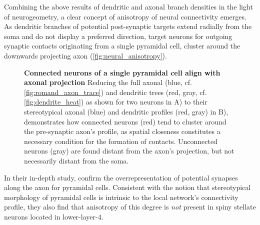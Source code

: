 Combining the above results of dendritic and axonal branch densities
in the light of neurogeometry, a clear concept of anisotropy of neural
connectivity emerges. As dendritic branches of potential post-synaptic
targets extend radially from the soma and do not display a preferred
direction, target neurons for outgoing synaptic contacts originating
from a single pyramidal cell, cluster around the downwards projecting
axon (\autoref{fig:neural_anisotropy}). %
\begin{figure}[!ht]
  \centering 

    \caption{%
      \textbf{Connected neurons of a single pyramidal cell align with
        axonal projection} Reducing the full axonal (blue,
      cf. \autoref{fig:romand_axon_trace}) and dendritic trees (red, gray,
      cf. \autoref{fig:dendrite_heat}) as shown for two neurons in A)
      to their stereotypical axonal (blue) and dendritic profiles
      (red, gray) in B), demonstrates how connected neurons (red) tend
      to cluster around the pre-synaptic axon's profile, as spatial
      closeness constitutes a necessary condition for the formation of
      contacts. Unconnected neurons (gray) are found distant from the
      axon's projection, but not necessarily distant from the soma. }
  \label{fig:neural_anisotropy}
\end{figure}
In their in-depth study, \textcite{Stepanyants2005} confirm the
overrepresentation of potential synapses along the axon for pyramidal
cells. Consistent with the notion that stereotypical morphology of
pyramidal cells is intrinsic to the local network's connectivity
profile, they also find that anisotropy of this degree is \textit{not}
present in spiny stellate neurons located in lower-layer-4.



